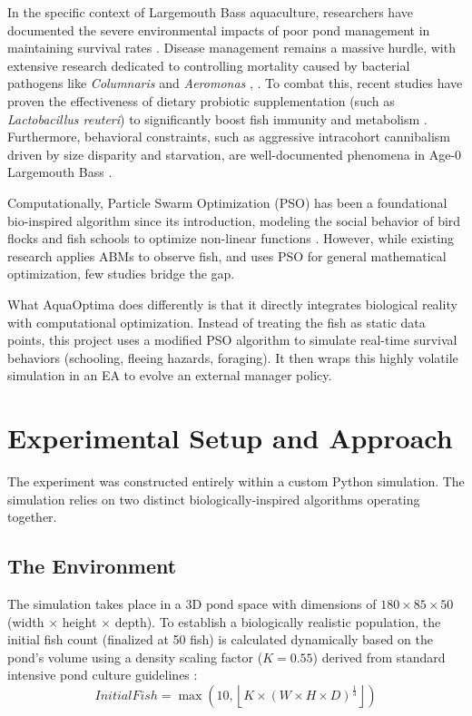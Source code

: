 \documentclass[conference]{IEEEtran}
\begin{document}
In the specific context of Largemouth Bass aquaculture, researchers have documented the severe environmental impacts of poor pond management in maintaining survival rates \cite{hou2023}. Disease management remains a massive hurdle, with extensive research dedicated to controlling mortality caused by bacterial pathogens like \textit{Columnaris} and \textit{Aeromonas} \cite{bowker2013}, \cite{tu2025}. To combat this, recent studies have proven the effectiveness of dietary probiotic supplementation (such as \textit{Lactobacillus reuteri}) to significantly boost fish immunity and metabolism \cite{wang2024}. Furthermore, behavioral constraints, such as aggressive intracohort cannibalism driven by size disparity and starvation, are well-documented phenomena in Age-0 Largemouth Bass \cite{johnson1996}.

Computationally, Particle Swarm Optimization (PSO) has been a foundational bio-inspired algorithm since its introduction, modeling the social behavior of bird flocks and fish schools to optimize non-linear functions \cite{kennedy1995}. However, while existing research applies ABMs to observe fish, and uses PSO for general mathematical optimization, few studies bridge the gap.

What AquaOptima does differently is that it directly integrates biological reality with computational optimization. Instead of treating the fish as static data points, this project uses a modified PSO algorithm to simulate real-time survival behaviors (schooling, fleeing hazards, foraging). It then wraps this highly volatile simulation in an EA to evolve an external manager policy.

\section{Experimental Setup and Approach}
The experiment was constructed entirely within a custom Python simulation. The simulation relies on two distinct biologically-inspired algorithms operating together.

\subsection{The Environment}
The simulation takes place in a 3D pond space with dimensions of $180 \times 85 \times 50$ (width $\times$ height $\times$ depth). To establish a biologically realistic population, the initial fish count (finalized at 50 fish) is calculated dynamically based on the pond's volume using a density scaling factor ($K = 0.55$) derived from standard intensive pond culture guidelines \cite{tidwell1998}:
\begin{equation}
\boxed{
InitialFish = \max\left(10, \left\lfloor K \times (W \times H \times D)^{\frac{1}{3}} \right\rfloor\right)
}
\end{equation}
\end{document}
